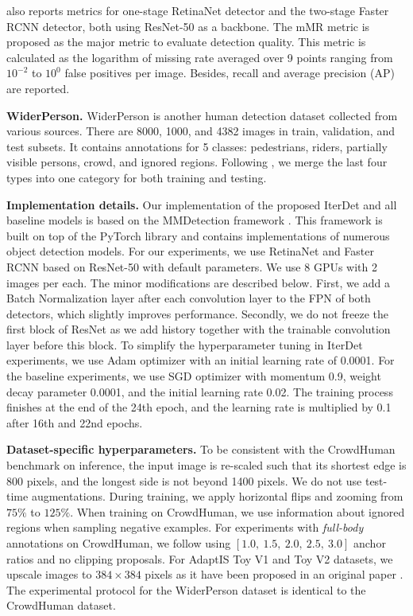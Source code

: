 \documentclass[runningheads]{llncs}
\begin{document}
\cite{shao2018crowdhuman} also reports metrics for one-stage RetinaNet detector and the two-stage Faster RCNN detector, both using ResNet-50 as a backbone. The mMR metric is proposed as the major metric to evaluate detection quality. This metric is calculated as the logarithm of missing rate averaged over 9 points ranging from $10^{-2}$ to $10^0$ false positives per image. Besides, recall and average precision (AP) are reported.

\textbf{WiderPerson.} WiderPerson \cite{zhang2019widerperson} is another human detection dataset collected from various sources. There are 8000, 1000, and 4382 images in train, validation, and test subsets. It contains annotations for 5 classes: pedestrians, riders, partially visible persons, crowd, and ignored regions. Following \cite{ge2020ps}, we merge the last four types into one category for both training and testing.

\textbf{Implementation details.} Our implementation of the proposed IterDet and all baseline models is based on the MMDetection framework \cite{mmdetection}. This framework is built on top of the PyTorch library \cite{paszke2019pytorch} and contains implementations of numerous object detection models. For our experiments, we use RetinaNet and Faster RCNN based on ResNet-50 with default parameters. We use 8 GPUs with 2 images per each. 
The minor modifications are described below. First, we add a Batch Normalization layer after each convolution layer to the FPN of both detectors, which slightly improves performance. Secondly, we do not freeze the first block of ResNet as we add history together with the trainable convolution layer before this block. 
To simplify the hyperparameter tuning in IterDet experiments, we use Adam optimizer with an initial learning rate of 0.0001. For the baseline experiments, we use SGD optimizer with momentum 0.9, weight decay parameter 0.0001, and the initial learning rate 0.02. The training process finishes at the end of the 24th epoch, and the learning rate is multiplied by 0.1 after 16th and 22nd epochs.

\textbf{Dataset-specific hyperparameters.} To be consistent with the CrowdHuman benchmark on inference, the input image is re-scaled such that its shortest edge is 800 pixels, and the longest side is not beyond 1400 pixels. We do not use test-time augmentations. During training, we apply horizontal flips and zooming from $75\%$ to $125\%$. When training on CrowdHuman, we use information about ignored regions when sampling negative examples. For experiments with \emph{full-body} annotations on CrowdHuman, we follow \cite{shao2018crowdhuman,ge2020ps,liu2019adaptive} using $[1.0,\ 1.5,\ 2.0,\ 2.5,\ 3.0]$ anchor ratios and no clipping proposals. For AdaptIS Toy V1 and Toy V2 datasets, we upscale images to $384 \times 384$ pixels as it have been proposed in an original paper \cite{sofiiuk2019adaptis}. The experimental protocol for the WiderPerson dataset is identical to the CrowdHuman dataset.
\end{document}
